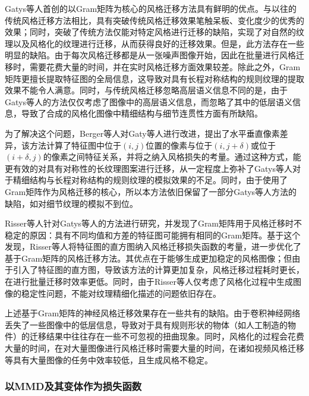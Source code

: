 Gatys等人首创的以Gram矩阵为核心的风格迁移方法具有鲜明的优点。与以往的传统风格迁移方法相比，具有突破传统风格迁移效果笔触呆板、变化度少的优秀的效果；同时，突破了传统方法仅能对特定风格进行迁移的缺陷，实现了对自然的纹理以及风格化的纹理进行迁移\cite{jingNeuralStyleTransfer2020}，从而获得良好的迁移效果。但是，此方法存在一些明显的缺陷。由于每次风格迁移都是从一张噪声图像开始，因此在批量进行风格迁移时，需要花费大量的时间，并在实时风格迁移方面效果较差。除此之外，Gram矩阵更擅长提取特征图的全局信息，这导致对具有长程对称结构的规则纹理的提取效果不能令人满意\cite{jingNeuralStyleTransfer2020}。同时，与传统风格迁移忽略高层语义信息不同的是，由于Gatys等人的方法仅仅考虑了图像中的高层语义信息，而忽略了其中的低层语义信息，导致了合成的风格化图像中精细结构与细节连贯性方面有所缺陷。

为了解决这个问题，Berger\cite{bergerIncorporatingLongrangeConsistency2016}等人对Gaty等人进行改进，提出了水平垂直像素差异，该方法计算了特征图中位于$(i,j)$位置的像素与位于$(i,j+\delta)$或位于$(i+\delta,j)$的像素之间特征关系，并将之纳入风格损失的考量。通过这种方式，能更有效的对具有对称性的长纹理图案进行迁移，从一定程度上弥补了Gatys等人对于精细结构与长程对称结构的规则纹理的模拟效果的不足。同时，由于使用了Gram矩阵作为风格迁移的核心，所以本方法依旧保留了一部分Gatys等人方法的缺陷，如对细节纹理的模拟不到位。

Risser\cite{risserStableControllableNeural2017}等人针对Gatys等人的方法进行研究，并发现了Gram矩阵用于风格迁移时不稳定的原因：具有不同均值和方差的特征图可能拥有相同的Gram矩阵。基于这个发现，Risser等人将特征图的直方图纳入风格迁移损失函数的考量，进一步优化了基于Gram矩阵的风格迁移方法。其优点在于能够生成更加稳定的风格图像；但由于引入了特征图的直方图，导致该方法的计算更加复杂，风格迁移过程耗时更长，在进行批量迁移时效率更低。同时，由于Risser等人仅考虑了风格化过程中生成图像的稳定性问题，不能对纹理精细化描述的问题依旧存在。

上述基于Gram矩阵的神经风格迁移效果存在一些共有的缺陷。由于卷积神经网络丢失了一些图像中的低层信息，导致对于具有规则形状的物体（如人工制造的物件）的迁移结果中往往存在一些不可忽视的扭曲现象。同时，风格化的过程会花费大量的时间，在对大量图像进行风格迁移时需要大量的时间，在诸如视频风格迁移等具有大量图像的任务中效率较低，且生成风格不稳定。

\subsubsection{以MMD及其变体作为损失函数}

